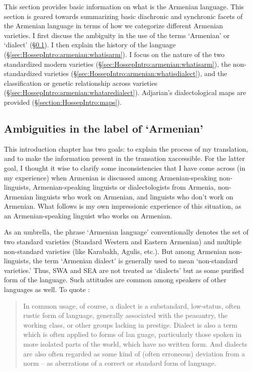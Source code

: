 This section provides basic information on what is the Armenian language. This section is geared towards summarizing basic diachronic and synchronic facets of the Armenian language in terms of how we categorize different Armenian varieties. I first discuss the ambiguity in the use of the terms `Armenian' or `dialect' (\S\ref{sec:HossepIntro:armenian:ambiguity}). I then explain the history of the language (\S\ref{sec:HossepIntro:armenian:whatisarm}). I   focus on the nature of the two standardized modern varieties  (\S\ref{sec:HossepIntro:armenian:whatisarm}), the non-standardized varieties (\S\ref{sec:HossepIntro:armenian:whatisdialect}), and the classification or genetic relationship across   varieties (\S\ref{sec:HossepIntro:armenian:whataredialect}). Adjarian's dialectological maps are provided   (\S\ref{section:HossepIntro:maps}).  

\subsection{Ambiguities in the label of `Armenian'}\label{sec:HossepIntro:armenian:ambiguity}



This introduction chapter has two goals: to explain the process of my translation, and to make the information present in the transation xaccessible. For the latter goal, I thought it wise to clarify some inconsistencies that I have come across (in my experience) when Armenian is discussed among Armenian-speaking non-linguists, Armenian-speaking linguists or dialectologists from Armenia, non-Armenian linguists who work on Armenian, and linguists who don't work on Armenian. What follows is my own impressionic experience of this situation, as an Armenian-speaking linguist who works on Armenian.

As an umbrella, the phrase `Armenian language' conventionally denotes the set of two standard varieties (Standard Western and Eastern Armenian) and multiple non-standard varieties (like Karabakh, Agulis, etc.). But among Armenian non-linguists, the term `Armenian dialect' is generally used to mean `non-standard varieties.'  Thus, SWA and SEA are not treated as `dialects' but as some purified form of the language. Such attitudes are common among speakers of other languages as well. To quote \citet[3]{ChambersTrudgill-1998-Dialectology}:


\begin{quote}
	In common usage, of course, a dialect is a substandard, low-status, often rustic form of language, generally associated with the peasantry, the working class, or other groups lacking in prestige. Dialect is also a term which is often applied to forms of lan guage, particularly those spoken in more isolated parts of the world, which have no written form. And dialects are also often regarded as some kind of (often erroneous) deviation from a norm – as aberrations of a correct or standard form of language.
\end{quote}


